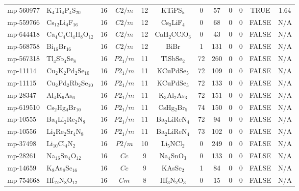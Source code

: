 {\begin{longtable}{llcccccccccc}
    mp-560977 & K$_{4}$Ti$_{4}$P$_{4}$S$_{20}$ & 16    & $C2/m$ & 12    & KTiPS$_{5}$ & 0     & 57    & 0     & 0     & TRUE  & 1.64  \\
    mp-559766 & Cs$_{12}$Li$_{4}$F$_{16}$ & 16    & $C2/m$ & 12    & Cs$_{3}$LiF$_{4}$ & 0     & 68    & 0     & 0     & FALSE & N/A \\
    mp-644418 & Ca$_{4}$C$_{4}$Cl$_{4}$H$_{8}$O$_{12}$ & 16    & $C2/m$ & 12    & CaH$_{2}$CClO$_{3}$ & 0     & 43    & 0     & 0     & FALSE & N/A \\
    mp-568758 & Bi$_{16}$Br$_{16}$ & 16    & $C2/m$ & 12    & BiBr  & 1     & 131   & 0     & 0     & FALSE & N/A \\
    mp-567318 & Tl$_{4}$Sb$_{4}$Se$_{8}$ & 16    & $P2_1/m$ & 11    & TlSbSe$_{2}$ & 72    & 260   & 0     & 0     & FALSE & N/A \\
    mp-11114 & Cu$_{2}$K$_{2}$Pd$_{2}$Se$_{10}$ & 16    & $P2_1/m$ & 11    & KCuPdSe$_{5}$ & 72    & 109   & 0     & 0     & FALSE & N/A \\
    mp-11115 & Cu$_{2}$Pd$_{2}$Rb$_{2}$Se$_{10}$ & 16    & $P2_1/m$ & 11    & KCuPdSe$_{5}$ & 72    & 133   & 0     & 0     & FALSE & N/A \\
    mp-28347 & Al$_{4}$K$_{6}$As$_{6}$ & 16    & $P2_1/m$ & 11    & K$_{3}$Al$_{2}$As$_{3}$ & 72    & 151   & 0     & 0     & FALSE & N/A \\
    mp-619510 & Cs$_{2}$Hg$_{4}$Br$_{10}$ & 16    & $P2_1/m$ & 11    & CsHg$_{2}$Br$_{5}$ & 74    & 150   & 0     & 0     & FALSE & N/A \\
    mp-10555 & Ba$_{4}$Li$_{2}$Re$_{2}$N$_{8}$ & 16    & $P2_1/m$ & 11    & Ba$_{2}$LiReN$_{4}$ & 72    & 94    & 0     & 0     & FALSE & N/A \\
    mp-10556 & Li$_{2}$Re$_{2}$Sr$_{4}$N$_{8}$ & 16    & $P2_1/m$ & 11    & Ba$_{2}$LiReN$_{4}$ & 73    & 102   & 0     & 0     & FALSE & N/A \\
    mp-37498 & Li$_{10}$Cl$_{4}$N$_{2}$ & 16    & $P2/m$ & 10    & Li$_{5}$NCl$_{2}$ & 0     & 249   & 0     & 0     & FALSE & N/A \\
    mp-28261 & Na$_{16}$Sn$_{4}$O$_{12}$ & 16    & $Cc$  & 9     & Na$_{4}$SnO$_{3}$ & 0     & 133   & 0     & 0     & FALSE & N/A \\
    mp-14659 & K$_{8}$As$_{8}$Se$_{16}$ & 16    & $Cc$  & 9     & KAsSe$_{2}$ & 1     & 84    & 0     & 0     & FALSE & N/A \\
    mp-754668 & Hf$_{12}$N$_{8}$O$_{12}$ & 16    & $Cm$  & 8     & Hf$_{3}$N$_{2}$O$_{3}$ & 0     & 15    & 0     & 0     & FALSE & N/A \\

\end{longtable}}
